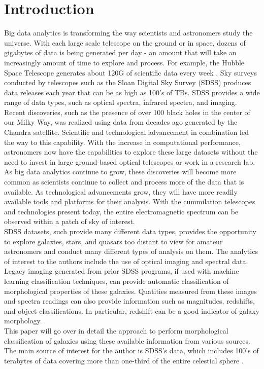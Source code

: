 \documentclass[11pt,sigconf]{acmart}
\begin{document}
\section{Introduction}

Big data analytics is transforming the way scientists and astronomers study the universe. 
With each large scale telescope on the ground or in space, dozens of gigabytes of data 
is being generated per day - an amount that will take an increasingly amount of time
to explore and process. For example, the Hubble Space Telescope generates about 120G of 
scientific data every week \cite{tillman}. Sky surveys conducted by telescopes such as
the Sloan Digital Sky Survey (SDSS) produces data releases each year that can be as high as
100's of TBs. SDSS provides a wide range of data types, such as optical spectra,
infrared spectra, and imaging. 
\\
Recent discoveries, such as the presence of over 100 black holes 
in the center of our Milky Way, was realized using data from decades ago generated by
the Chandra satellite. Scientific and technological advancement in combination led the 
way to this capability. With the increase in computational performance, astronomers 
now have the capabilities to explore these large datasets without the need to invest 
in large ground-based optical telescopes or work in a research lab. 
As big data analytics continue to grow, these discoveries will become more common as 
scientists continue to collect and process more of the data that is available. As technological
advancements grow, they will have more readily available tools and platforms for their 
analysis. With the cummilation telescopes and technologies present today, the entire 
electromagnetic spectrum can be observed within a patch of sky of interest. 
\\
SDSS datasets, such provide many different data types, provides the opportunity to
explore galaxies, stars, and quasars too distant to view for amateur astronomers and 
conduct many different types of analysis on them. The analytics of interest to the
authors include the use of optical imaging and spectral data. Legacy imaging generated 
from prior SDSS programs, if used with machine learning classification techniques, 
can provide automatic classification of morphological properties of these galaxies. 
Quatities measured from these images and spectra readings can also provide information
such as magnitudes, redshifts, and object classifications. In particular, redshift can
be a good indicator of galaxy morphology. 
\\
This paper will go over in detail the approach to perform morphological classification of 
galaxies using these available information from various sources. The main source of interest
for the author is SDSS's data, which includes 100's of terabytes of data covering more
than one-third of the entire celestial sphere \cite{abdurro}.
\end{document}

